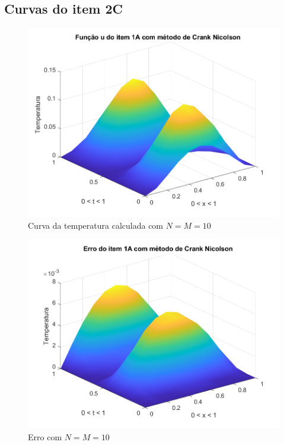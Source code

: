 \documentclass[12pt]{article}
\begin{document}
\begin{spacing}{1.5}

\clearpage
\subsection{Curvas do item 2C} \label{curvas2C}

\begin{figure}[ht!]
    \centering
    \includegraphics[width=0.8\linewidth]{Segunda_Tarefa/ItemC/nm10_calculada_A.png}
    \caption{Curva da temperatura calculada com $N=M=10$}
    \label{fig:CA_nm10_calculada}
\end{figure}

\begin{figure}
    \centering
    \includegraphics[width=0.8\linewidth]{Segunda_Tarefa/ItemC/nm10_erro_A.png}
    \caption{Erro com $N=M=10$}
    \label{fig:CA_nm10_erro}
\end{figure}


\end{spacing}
\end{document}
